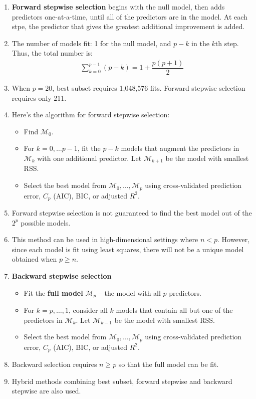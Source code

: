 \documentclass[10pt]{article}
\newcommand{\MM}{{\mathcal{M}}}
\begin{document}
\begin{enumerate}
	\item \textbf{Forward stepwise selection} begins with the null model, then adds predictors one-at-a-time, until all of the predictors are in the model.  At each stpe, the predictor that gives the greatest additional improvement is added.
	\item The number of models fit: 1 for the null model, and $p - k$ in the $k$th step.  Thus, the total number is:
	\begin{align*}
		\sum_{k = 0}^{p -1} (p - k) = 1 + \dfrac{p(p + 1)}{2} 
	\end{align*}
	\item When $p = 20$, best subset requires 1,048,576 fits.  Forward stepwise selection requires only 211.
	\item Here's the algorithm for forward stepwise selection: \begin{itemize}
		\item Find $\mathcal{M}_0$.
		\item For $k = 0, \dots p-1$, fit the $p-k$ models that augment the predictors in $\MM_k$ with one additional predictor.  Let $\MM_{k+1}$ be the model with smallest RSS.
		\item Select the best model from $\MM_0, \dots, \MM_p$ using cross-validated prediction error, $C_p$ (AIC), BIC, or adjusted $R^2$.
	\end{itemize}
	\item Forward stepwise selection is not guaranteed to find the best model out of the $2^p$ possible models. 
	\item This method can be used in high-dimensional settings where $n < p$.  However, since each model is fit using least squares, there will not be a unique model obtained when $p \geq n$. 
	\item \textbf{Backward stepwise selection} \begin{itemize}
		\item Fit the \textbf{full model} $\MM_p$ -- the model with all $p$ predictors.
		\item For $k = p, \dots, 1$, consider all $k$ models that contain all but one of the predictors in $\MM_k$.  Let $\MM_{k -1}$ be the model with smallest RSS.
		\item Select the best model from $\MM_0, \dots, \MM_p$ using cross-validated prediction error, $C_p$ (AIC), BIC, or adjusted $R^2$.	\end{itemize}
	\item Backward selection requires $n \geq p$ so that the full model can be fit.
	\item Hybrid methods combining best subset, forward stepwise and backward stepwise are also used.
\end{enumerate}
\end{document}
